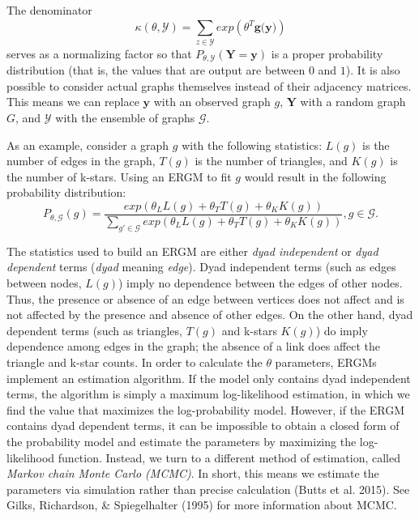 \documentclass[12pt,twoside]{amherstthesis}
\begin{document}
  The denominator
  \[\kappa(\theta, \mathcal{Y}) = \sum_{z \in \mathcal{Y}}^{} exp(\theta^{T}\textbf{g(y)})\]
  serves as a normalizing factor so that
  \(P_{\theta, \mathcal{Y}}(\textbf{Y} = \textbf{y})\) is a proper
  probability distribution (that is, the values that are output are
  between \(0\) and \(1\)). It is also possible to consider actual graphs
  themselves instead of their adjacency matrices. This means we can
  replace \(\textbf{y}\) with an observed graph \(g\), \(\textbf{Y}\) with
  a random graph \(G\), and \(\mathcal{Y}\) with the ensemble of graphs
  \(\mathcal{G}\).
  
  As an example, consider a graph \(g\) with the following statistics:
  \(L(g)\) is the number of edges in the graph, \(T(g)\) is the number of
  triangles, and \(K(g)\) is the number of k-stars. Using an ERGM to fit
  \(g\) would result in the following probability distribution:
  \[P_{\theta, \mathcal{G}}(g) = \frac {exp(\theta_{L}L(g) + \theta_{T}T(g)+\theta_{K}K(g))} {\sum_{g' \in \mathcal{G}}^{} exp(\theta_{L}L(g) + \theta_{T}T(g)+\theta_{K}K(g))}, g \in \mathcal{G}.\]
  
  The statistics used to build an ERGM are either \emph{dyad independent}
  or \emph{dyad dependent} terms (\emph{dyad} meaning \emph{edge}). Dyad
  independent terms (such as edges between nodes, \(L(g)\)) imply no
  dependence between the edges of other nodes. Thus, the presence or
  absence of an edge between vertices does not affect and is not affected
  by the presence and absence of other edges. On the other hand, dyad
  dependent terms (such as triangles, \(T(g)\) and k-stars \(K(g)\)) do
  imply dependence among edges in the graph; the absence of a link does
  affect the triangle and k-star counts. In order to calculate the
  \(\theta\) parameters, ERGMs implement an estimation algorithm. If the
  model only contains dyad independent terms, the algorithm is simply a
  maximum log-likelihood estimation, in which we find the value that
  maximizes the log-probability model. However, if the ERGM contains dyad
  dependent terms, it can be impossible to obtain a closed form of the
  probability model and estimate the parameters by maximizing the
  log-likelihood function. Instead, we turn to a different method of
  estimation, called \emph{Markov chain Monte Carlo (MCMC)}. In short,
  this means we estimate the parameters via simulation rather than precise
  calculation (Butts et al. 2015). See Gilks, Richardson, \& Spiegelhalter
  (1995) for more information about MCMC.
  
\end{document}
